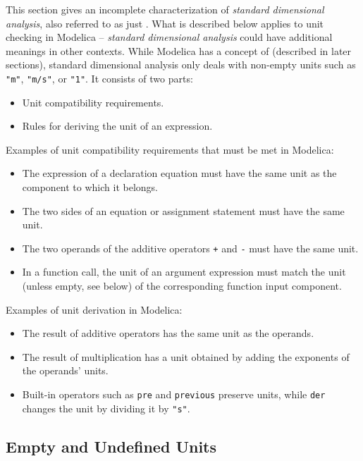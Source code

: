 This section gives an incomplete characterization of \emph{standard dimensional analysis}, also referred to as just .
What is described below applies to unit checking in Modelica -- \emph{standard dimensional analysis} could have additional meanings in other contexts.
While Modelica has a concept of  (described in later sections), standard dimensional analysis only deals with non-empty units such as \lstinline!"m"!, \lstinline!"m/s"!, or \lstinline!"1"!.
It consists of two parts:
\begin{itemize}
\item
  Unit compatibility requirements.
\item
  Rules for deriving the unit of an expression.
\end{itemize}

Examples of unit compatibility requirements that must be met in Modelica:
\begin{itemize}
\item
  The expression of a declaration equation must have the same unit as the component to which it belongs.
\item
  The two sides of an equation or assignment statement must have the same unit.
\item
  The two operands of the additive operators \lstinline!+! and \lstinline!-! must have the same unit.
\item
  In a function call, the unit of an argument expression must match the unit (unless empty, see below) of the corresponding function input component.
\end{itemize}

Examples of unit derivation in Modelica:
\begin{itemize}
\item
  The result of additive operators has the same unit as the operands.
\item
  The result of multiplication has a unit obtained by adding the exponents of the operands' units.
\item
  Built-in operators such as \lstinline!pre! and \lstinline!previous! preserve units, while \lstinline!der! changes the unit by dividing it by \lstinline!"s"!.
\end{itemize}


\subsection{Empty and Undefined Units}\label{empty-and-undefined-units}

